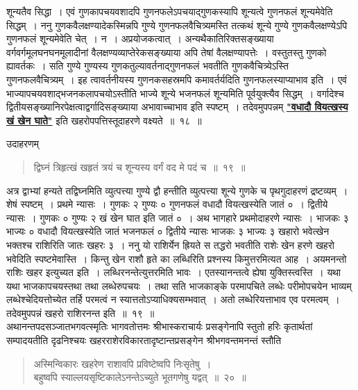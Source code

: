 \documentclass[11pt, openany]{book}
\begin{document}
शून्यतैव सिद्धा~। एवं गुणकापचयवशादपि गुणनफलेऽपचयाद्गुणकस्यापि
शून्यत्वे गुणनफलं शून्यमेवेति सिद्धम्~। ननु गुणकवैलक्षण्यादेकस्मिन्नपि
गुण्ये गुणनफलवैचित्र्यमस्ति तत्कथं शून्ये गुण्ये गुणकवैलक्षण्येऽपि गुणनफलं
शून्यमेवेति चेत्~। न~। अप्रयोजकत्वात्~। अन्यथैकातिरिक्तसङ्ख्याया
वर्गवर्गमूलघनघनमूलादीनां वैलक्षण्यव्याप्तेरेकसङ्ख्याया अपि तेषां वैलक्षण्यापत्तेः~।
वस्तुतस्तु गुणको ह्यावर्तकः~। सति गुण्ये गुण्यस्य गुणकतुल्यावर्तनाद्गुणनफलं भवतीति
गुणकवैचित्र्येऽस्ति गुणनफलवैचित्र्यम्~। इह त्वावर्तनीयस्य गुणनकसहस्रमपि
कमावर्तर्यदिति गुणनफलस्याप्याभाव इति~। एवं भाज्यापचयवशाद्भजनकलापचयोऽस्तीति
भाज्ये शून्ये भजनफलं शून्यमिति पूर्वयुक्त्यैव सिद्धम्~। वर्गादेश्च
द्वितीयसङ्ख्यानिरपेक्षत्वाद्वर्गादिसङ्ख्याया अभावाच्चाभाव इति स्पष्टम्~।
तदेवमुपपन्नम् \hyperref[18]{\textbf{"वधादौ वियत्खस्य खं खेन घाते"}} इति खहरोपपत्तिस्तूदाहरणे वक्ष्यते~॥~१८~॥
 \newpage %

{\bqt उदाहरणम्\textendash \,}
\begin{quote}
   \eg
    द्विघ्नं त्रिहृत्खं खहृतं त्रयं च शून्यस्य वर्गं वद मे पदं च~॥~१९~॥
\end{quote}

अत्र द्वाभ्यां हन्यते तद्विघ्नमिति व्युत्पत्त्या गुण्ये द्वौ हन्तीति
व्युत्पत्त्या शून्ये गुणके च पृथगुदाहरणं द्रष्टव्यम्~। शेषं स्पष्टम्~।
प्रथमे न्यासः~। गुणकः २ गुण्यः ० गुणनफलं वधादौ वियत्खस्येति जातं ०~। 
द्वितीये न्यासः~। गुणकः ० गुण्यः २ खं खेन घात इति जातं ०~। अथ भागहारे
प्रथमोदाहरणे न्यासः~। भाजकः ३ भाज्यः ० वधादौ वियत्खस्येति जातं
भजनफलं ० द्वितीये न्यासः भाजकः ३ भाज्यः ३ खहारो भवेत्खेन भक्तश्च
राशिरिति जातः खहरः ३~। ननु यो राशिर्येन ह्रियते स तद्धरो भवतीति
राशेः खेन हरणे खहरो भवेदिति स्पष्टमेवास्ति~। किन्तु खेन राशौ हृते का
लब्धिरिति प्रश्नस्य किमुत्तरमित्यत आह~। अयमनन्तो राशिः खहर
इत्युच्यत इति~। लब्धिरनन्तेत्युत्तरमिति भावः~। एतस्यानन्तत्वे ह्येषा
युक्तिस्त्वस्ति~। यथा यथा भाजकापचयस्तथा तथा लब्धेरुपचयः~। तथा
सति भाजकाङ्के परमापचिते लब्धेः परीमोपचयेन भाव्यम् लब्धेश्चेदियत्तोच्येत
तर्हि परमत्वं न स्यात्ततोऽप्याधिक्यसम्भवात्~। अतो लब्धेरियत्ताभाव एव
परमत्वम्~। तदेवमुपपन्नं खहरो राशिरनन्त इति~॥~१९~॥\\

\vspace{-4mm}
अथानन्तपदसञ्जातभगवत्स्मृतिः भागवतोत्तमः श्रीभास्कराचार्यः प्रसङ्गेनापि
स्तुतो हरिः कृतार्थतां सम्पादयतीति दृढनिश्चयः खहरराशेरविकारतादृष्टान्तप्रसङ्गेन श्रीभगवन्तमनन्तं स्तौति\textendash \,
\begin{quote}
    \ab
    अस्मिन्विकारः खहरेण राशावपि प्रविष्टेष्वपि निःसृतेषु~। \\
बहुष्वपि स्याल्लयसृष्टिकालेऽनन्तेऽच्युते भूतगणेषु यद्वत्~॥~२०~॥
\end{quote}
\end{document}
